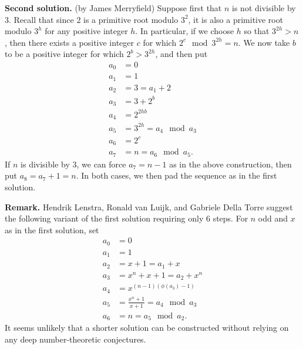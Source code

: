 \documentclass[amssymb,twocolumn,pra,10pt,aps]{revtex4-1}
\begin{document}
\begin{itemize}
\textbf{Second solution.}
(by James Merryfield)
Suppose first that $n$ is not divisible by 3. Recall that since $2$ is a primitive root modulo
$3^2$, it is also a primitive root modulo $3^h$ for any positive integer $h$. In particular,
if we choose $h$ so that $3^{2h} > n$, then
there exists a positive integer $c$ for which $2^c \mod 3^{2h} = n$.
We now take $b$ to be a positive integer for which $2^b > 3^{2h}$, and then put
\begin{align*}
a_0 &= 0\\
a_1 &= 1\\
a_2 &= 3 = a_1 + 2\\
a_3 &= 3 + 2^b \\
a_4 &= 2^{2hb} \\
a_5 &= 3^{2h} = a_4 \mod a_3 \\
a_6 &= 2^c \\
a_7 &= n = a_6 \mod a_5.
\end{align*}
If $n$ is divisible by 3, we can force $a_7 = n-1$ as in the above
construction, then put $a_{8} = a_7 + 1 = n$. In both cases, we then pad the sequence
as in the first solution.

\textbf{Remark.}
Hendrik Lenstra, Ronald van Luijk, and Gabriele Della Torre
suggest the following variant of the first solution requiring only 6 steps.
For $n$ odd and $x$ as in the first solution, set
\begin{align*}
a_0 &= 0\\
a_1 &= 1\\
a_2 &= x+1 = a_1 + x\\
a_3 &= x^n+x+1 = a_2 + x^n\\
a_4 &= x^{(n-1)(\phi(a_3)-1)}\\
a_5 &= \frac{x^n+1}{x+1} = a_4 \mod a_3 \\
a_6 &= n = a_5 \mod a_2.
\end{align*}
It seems unlikely that a shorter solution can be constructed without relying on
any deep number-theoretic conjectures.

\end{itemize}
\end{document}

